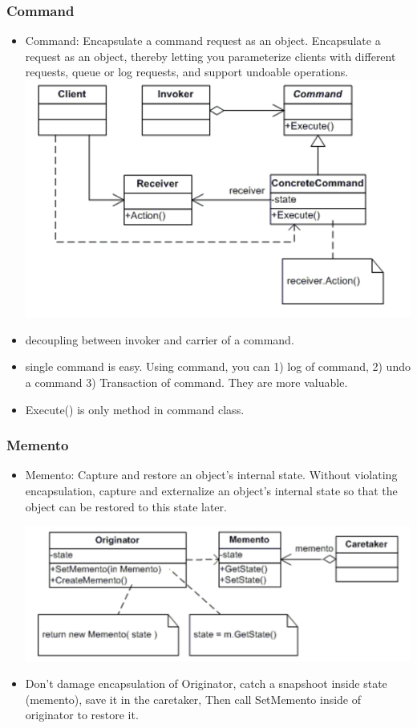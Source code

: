 \documentclass[a4paper,12pt,twoside]{book}
\begin{document}
\subsubsection{Command}
\begin{itemize}
\item Command: Encapsulate a command request as an object. Encapsulate a request as an object, thereby letting you parameterize clients with different requests, queue or log requests, and support undoable operations.
\includegraphics[scale=0.75]{pics/command.png}

\item decoupling between invoker and carrier of a command. 

\item single command is easy. Using command, you can 1) log of command, 2) undo a command 3) Transaction of command. They are more valuable. 

\item Execute() is only method in command class. 
\end{itemize}

\subsubsection{Memento}
\begin{itemize}
\item Memento: Capture and restore an object's internal state. Without violating encapsulation, capture and externalize an object’s internal state so that the object can be restored to this state later.

\includegraphics[scale=0.65]{pics/memento.png}

\item Don't damage encapsulation of Originator,  catch a snapshoot inside state (memento), save it in the caretaker, Then call SetMemento inside of originator to restore it. 
\end{itemize}
\end{document}
